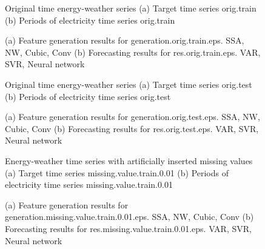 \documentclass[12pt]{article}
\begin{document}
\begin{figure}
\centering
{}
\caption{Original time energy-weather series	(a) Target time series	orig.train	(b) Periods of electricity time series	orig.train	}
\end{figure}


\begin{figure}
\centering
{}
\caption{(a)	Feature generation results for	generation.orig.train.eps.	SSA, NW, Cubic, Conv	(b)	Forecasting results for	res.orig.train.eps.	VAR, SVR, Neural network	}
\end{figure}


\begin{figure}
\centering
{}
\caption{Original time energy-weather series	(a) Target time series	orig.test	(b) Periods of electricity time series	orig.test	}
\end{figure}


\begin{figure}
\centering
{}
\caption{(a)	Feature generation results for	generation.orig.test.eps.	SSA, NW, Cubic, Conv	(b)	Forecasting results for	res.orig.test.eps.	VAR, SVR, Neural network	}
\end{figure}


\begin{figure}
\centering
{}
\caption{Energy-weather time series with artificially inserted missing values	(a) Target time series	missing.value.train.0.01	(b) Periods of electricity time series	missing.value.train.0.01	}
\end{figure}


\begin{figure}
\centering
{}
\caption{(a)	Feature generation results for	generation.missing.value.train.0.01.eps.	SSA, NW, Cubic, Conv	(b)	Forecasting results for	res.missing.value.train.0.01.eps.	VAR, SVR, Neural network	}
\end{figure}
\end{document}
